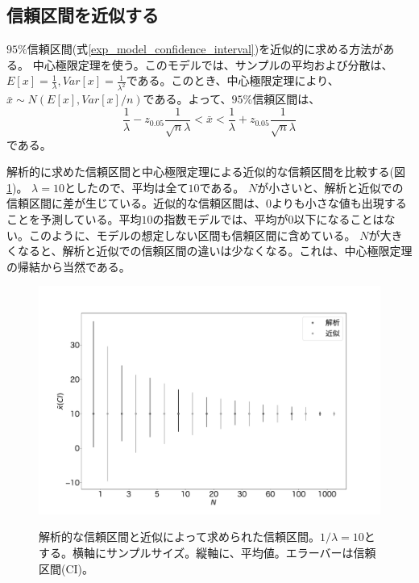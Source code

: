 \subsection{信頼区間を近似する}
$95\%$信頼区間(式\ref{exp_model_confidence_interval})を近似的に求める方法がある。
中心極限定理を使う。このモデルでは、サンプルの平均および分散は、$E[x]=\frac{1}{\lambda},Var[x]=\frac{1}{\lambda^2}$である。このとき、中心極限定理により、$\bar{x}\sim N(E[x],Var[x]/n)$である。よって、$95\%$信頼区間は、
\begin{equation*}
    \frac{1}{\lambda}-z_{0.05}\frac{1}{\sqrt{n}\lambda}<\bar{x}<\frac{1}{\lambda}+z_{0.05}\frac{1}{\sqrt{n}\lambda}
\end{equation*}
である。

解析的に求めた信頼区間と中心極限定理による近似的な信頼区間を比較する(図\ref{fig:model_predict_CI_interval})。
$\lambda=10$としたので、平均は全て$10$である。
$N$が小さいと、解析と近似での信頼区間に差が生じている。近似的な信頼区間は、$0$よりも小さな値も出現することを予測している。平均$10$の指数モデルでは、平均が$0$以下になることはない。このように、モデルの想定しない区間も信頼区間に含めている。
$N$が大きくなると、解析と近似での信頼区間の違いは少なくなる。これは、中心極限定理の帰結から当然である。

\begin{figure}
    \begin{center}
        \includegraphics[width=15cm]{./image/12_/confidence_expon_interval.pdf}
        \label{fig:model_predict_CI_interval}
        \caption{解析的な信頼区間と近似によって求められた信頼区間。$1/\lambda=10$とする。横軸にサンプルサイズ。縦軸に、平均値。エラーバーは信頼区間(CI)。}
      \end{center}
    \end{figure}

